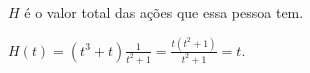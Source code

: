 $H$ é o valor total das ações que essa pessoa tem.

$H(t)=(t^3+t)\frac{1}{t^2+1}=\frac{t(t^2+1)}{t^2+1}=t$.
